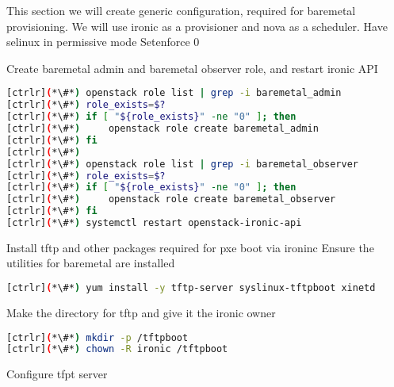 This section we will create generic configuration, required for baremetal provisioning. We will use ironic as a provisioner and nova as a scheduler.
Have selinux in permissive mode
Setenforce 0

Create baremetal admin and baremetal observer role, and restart ironic API


\begin{lstlisting}[language=bash,keywords={}]
[ctrlr](*\#*) openstack role list | grep -i baremetal_admin
[ctrlr](*\#*) role_exists=$?
[ctrlr](*\#*) if [ "${role_exists}" -ne "0" ]; then 
[ctrlr](*\#*)     openstack role create baremetal_admin
[ctrlr](*\#*) fi
[ctrlr](*\#*) 
[ctrlr](*\#*) openstack role list | grep -i baremetal_observer 
[ctrlr](*\#*) role_exists=$?
[ctrlr](*\#*) if [ "${role_exists}" -ne "0" ]; then
[ctrlr](*\#*)     openstack role create baremetal_observer
[ctrlr](*\#*) fi
[ctrlr](*\#*) systemctl restart openstack-ironic-api
\end{lstlisting} 

Install tftp and other packages required for pxe boot via ironinc
Ensure the utilities for baremetal are installed


\begin{lstlisting}[language=bash,keywords={}]
[ctrlr](*\#*) yum install -y tftp-server syslinux-tftpboot xinetd
\end{lstlisting} 

Make the directory for tftp and give it the ironic owner


\begin{lstlisting}[language=bash,keywords={}]
[ctrlr](*\#*) mkdir -p /tftpboot
[ctrlr](*\#*) chown -R ironic /tftpboot
\end{lstlisting} 

Configure tfpt server


